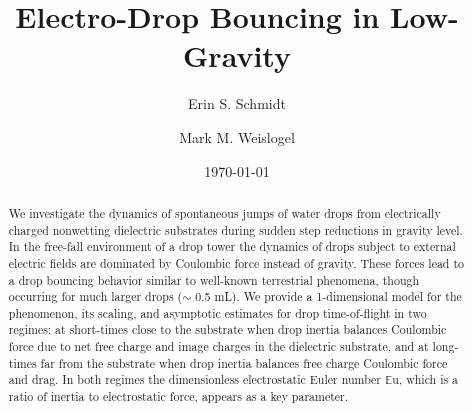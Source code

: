 \documentclass[aip,reprint, floatfix]{revtex4-1}
\begin{document}
\newcommand{\redline}{\raisebox{2pt}{\tikz{\draw[-,red,solid,line width = 1.5pt](0,0) -- (5mm,0);}}}
\graphicspath{ {../figures/} }

\newcommand{\blueline}{\raisebox{2pt}{\tikz{\draw[-,blue,solid,line width = 1.5pt](0,0) -- (5mm,0);}}}
\graphicspath{ {../figures/} }

\newcommand{\cyanline}{\raisebox{2pt}{\tikz{\draw[-,cyan,solid,line width = 1.5pt](0,0) -- (5mm,0);}}}
\graphicspath{ {../figures/} }


\title{Electro-Drop Bouncing in Low-Gravity} %



\author{Erin S. Schmidt}

\author{Mark M. Weislogel}



\date{\today}

\begin{abstract}

We investigate the dynamics of spontaneous jumps of water drops from electrically charged nonwetting dielectric substrates during sudden step reductions in gravity level. In the free-fall environment of a drop tower the dynamics of drops subject to external electric fields are dominated by Coulombic force instead of gravity. These forces lead to a drop bouncing behavior similar to well-known terrestrial phenomena, though occurring for much larger drops ($\sim$ 0.5 mL). We provide a 1-dimensional model for the phenomenon, its scaling, and asymptotic estimates for drop time-of-flight in two regimes: at short-times close to the substrate when drop inertia balances Coulombic force due to net free charge and image charges in the dielectric substrate, and at long-times far from the substrate when drop inertia balances free charge Coulombic force and drag. In both regimes the dimensionless electrostatic Euler number $\mathbb{E}\mbox{u}$, which is a ratio of inertia to electrostatic force, appears as a key parameter.
\end{abstract}
\end{document}

